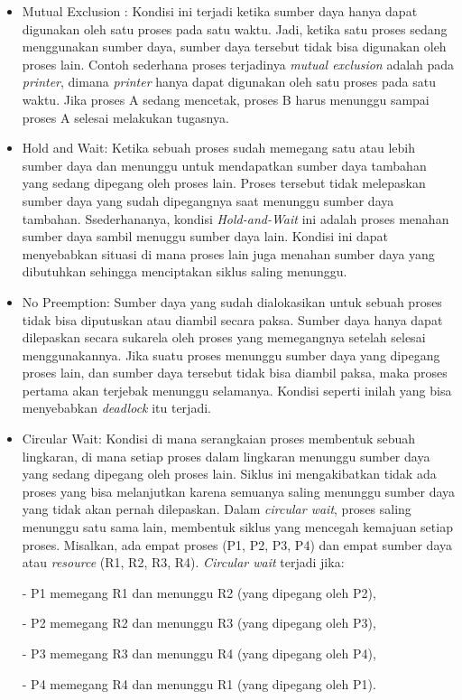 \documentclass[12pt]{article}
\begin{document}
\begin{itemize}
    \item Mutual Exclusion : Kondisi ini terjadi ketika sumber daya hanya dapat digunakan oleh satu proses pada satu waktu. Jadi, ketika satu proses sedang menggunakan sumber daya, sumber daya tersebut tidak bisa digunakan oleh proses lain. Contoh sederhana proses terjadinya \textit{mutual exclusion} adalah pada \textit{printer}, dimana \textit{printer} hanya dapat digunakan oleh satu proses pada satu waktu. Jika proses A sedang mencetak, proses B harus menunggu sampai proses A selesai melakukan tugasnya.
    
    \item Hold and Wait: Ketika sebuah proses sudah memegang satu atau lebih sumber daya dan menunggu untuk mendapatkan sumber daya tambahan yang sedang dipegang oleh proses lain. Proses tersebut tidak melepaskan sumber daya yang sudah dipegangnya saat menunggu sumber daya tambahan. Ssederhananya, kondisi \textit{Hold-and-Wait} ini adalah proses menahan sumber daya sambil menuggu sumber daya lain.  Kondisi ini dapat menyebabkan situasi di mana proses lain juga menahan sumber daya yang dibutuhkan sehingga menciptakan siklus saling menunggu.
    
    \item No Preemption:  Sumber daya yang sudah dialokasikan untuk sebuah proses tidak bisa diputuskan atau diambil secara paksa. Sumber daya hanya dapat dilepaskan secara sukarela oleh proses yang memegangnya setelah selesai menggunakannya. Jika suatu proses menunggu sumber daya yang dipegang proses lain, dan sumber daya tersebut tidak bisa diambil paksa, maka proses pertama akan terjebak menunggu selamanya. Kondisi seperti inilah yang bisa menyebabkan \textit{deadlock} itu terjadi.
    
    \item Circular Wait:  Kondisi di mana serangkaian proses membentuk sebuah lingkaran, di mana setiap proses dalam lingkaran menunggu sumber daya yang sedang dipegang oleh proses lain. Siklus ini mengakibatkan tidak ada proses yang bisa melanjutkan karena semuanya saling menunggu sumber daya yang tidak akan pernah dilepaskan.
    Dalam \textit{circular wait}, proses saling menunggu satu sama lain, membentuk siklus yang mencegah kemajuan setiap proses. Misalkan, ada empat proses (P1, P2, P3, P4) dan empat sumber daya atau \textit{resource} (R1, R2, R3, R4). \textit{Circular wait} terjadi jika:

    - P1 memegang R1 dan menunggu R2 (yang dipegang oleh P2),
    
    - P2 memegang R2 dan menunggu R3 (yang dipegang oleh P3),
    
    - P3 memegang R3 dan menunggu R4 (yang dipegang oleh P4),
    
    - P4 memegang R4 dan menunggu R1 (yang dipegang oleh P1).
\end{itemize}
\begin{enumerate}

\end{enumerate}
\end{document}
